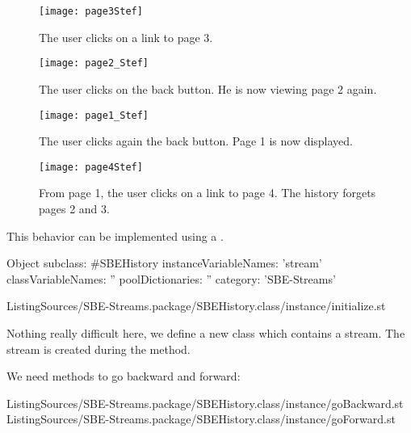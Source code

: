 \documentclass[a4paper,10pt,twoside]{book}
\begin{document}
\begin{figure}[!ht]
\centerline{\texttt{[image: page3Stef]}}
\caption{The user clicks on a link to page 3.}
\label{fig:page3}
\vspace{.2in}
\end{figure}

\begin{figure}[!ht]
\centerline{\texttt{[image: page2\_Stef]}}
\caption{The user clicks on the back button. He is now viewing page 2 again.}
\label{fig:page2_}
\vspace{.2in}
\end{figure}

\begin{figure}[!ht]
\centerline{\texttt{[image: page1\_Stef]}}
\caption{The user clicks again the back button. Page 1 is now displayed.}
\label{fig:page1_}
\vspace{.2in}
\end{figure}

\begin{figure}[!ht]
\centerline{\texttt{[image: page4Stef]}}
\caption{From page 1, the user clicks on a link to page 4. The history forgets pages 2 and 3.}
\label{fig:page4}
\vspace{.2in}
\end{figure}

This behavior can be implemented using a .

\begin{code}{}
Object subclass: #SBEHistory
	instanceVariableNames: 'stream'
	classVariableNames: ''
	poolDictionaries: ''
	category: 'SBE-Streams'
\end{code}

\numFiletreeMethodInput[sbehistoryinitialize]%
{}%
{ListingSources/SBE-Streams.package/SBEHistory.class/instance/initialize.st}

Nothing really difficult here, we define a new class which contains a stream.
The stream is created during the  method.

We need methods to go backward and forward:

\numFiletreeMethodInput[sbehistorygobackward]%
{}%
{ListingSources/SBE-Streams.package/SBEHistory.class/instance/goBackward.st}
\numFiletreeMethodInput[sbehistorygoforward]%
{}%
{ListingSources/SBE-Streams.package/SBEHistory.class/instance/goForward.st}
\end{document}
